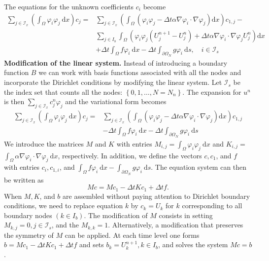 \documentclass[../main.tex]{subfiles}
\begin{document}
		The equations for the unknown coefficients $c_{i}$ become
		$$
		\begin{aligned}
			\sum_{j \in \mathcal{I}_{x}}\left(\int_{\Omega} \varphi_{i} \varphi_{j} \mathrm{~d} x\right) c_{j}=& \sum_{j \in \mathcal{I}_{x}}\left(\int_{\Omega}\left(\varphi_{i} \varphi_{j}-\Delta t \alpha \nabla \varphi_{i} \cdot \nabla \varphi_{j}\right) \mathrm{d} x\right) c_{1, j}-\\
			& \sum_{j \in I_{b}} \int_{\Omega}\left(\varphi_{i} \varphi_{j}\left(U_{j}^{n+1}-U_{j}^{n}\right)+\Delta t \alpha \nabla \varphi_{i} \cdot \nabla \varphi_{j} U_{j}^{n}\right) \mathrm{d} x \\
			&+\Delta t \int_{\Omega} f \varphi_{i} \mathrm{~d} x-\Delta t \int_{\partial \Omega_{N}} g \varphi_{i} \mathrm{~d} s, \quad i \in \mathcal{I}_{s}
		\end{aligned}
		$$
		\noindent \textbf{Modification of the linear system.} Instead of introducing a boundary function $B$ we can work with basis functions associated with all the nodes and incorporate the Dirichlet conditions by modifying the linear system. Let $\mathcal{I}_{s}$ be the index set that counts all the nodes: $\left\{0,1, \ldots, N=N_{n}\right\}$. The expansion for $u^{n}$ is then $\sum_{j \in \mathcal{I}_{x}} c_{j}^{n} \varphi_{j}$ and the variational form becomes
		$$
		\begin{aligned}
			\sum_{j \in \mathcal{I}_{x}}\left(\int_{\Omega} \varphi_{i} \varphi_{j} \mathrm{~d} x\right) c_{j}=& \sum_{j \in \mathcal{I}_{x}}\left(\int_{\Omega}\left(\varphi_{i} \varphi_{j}-\Delta t \alpha \nabla \varphi_{i} \cdot \nabla \varphi_{j}\right) \mathrm{d} x\right) c_{1, j} \\
			&-\Delta t \int_{\Omega} f \varphi_{i} \mathrm{~d} x-\Delta t \int_{\partial \Omega_{N}} g \varphi_{i} \mathrm{~d} s
		\end{aligned}
		$$
		We introduce the matrices $M$ and $K$ with entries $M_{i, j}=\int_{\Omega} \varphi_{i} \varphi_{j} \mathrm{~d} x$ and $K_{i, j}=$ $\int_{\Omega} \alpha \nabla \varphi_{i} \cdot \nabla \varphi_{j} \mathrm{~d} x$, respectively. In addition, we define the vectors $c, c_{1}$, and $f$ with entries $c_{i}, c_{1, i}$, and $\int_{\Omega} f \varphi_{i} \mathrm{~d} x-\int_{\partial \Omega_{N}} g \varphi_{i} \mathrm{~d} s$. The equation system can then be written as
		$$
		M c=M c_{1}-\Delta t K c_{1}+\Delta t f .
		$$
		When $M, K$, and $b$ are assembled without paying attention to Dirichlet boundary conditions, we need to replace equation $k$ by $c_{k}=U_{k}$ for $k$ corresponding to all boundary nodes $\left(k \in I_{b}\right)$. The modification of $M$ consists in setting $M_{k, j}=0, j \in \mathcal{I}_{s}$, and the $M_{k, k}=1$. Alternatively, a modification that preserves the symmetry of $M$ can be applied. At each time level one forms $b=M c_{1}-\Delta t K c_{1}+\Delta t f$ and sets $b_{k}=U_{k}^{n+1}, k \in I_{b}$, and solves the system $M c=b$.
		
\end{document}
